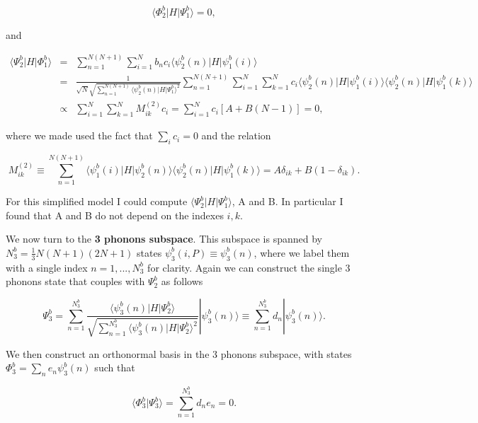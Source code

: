 \documentclass[pt12]{article}
\begin{document}
\begin{equation}
\langle \Phi^b_2 |H| \Psi^b_1 \rangle = 0,
\end{equation}

and

\begin{eqnarray}\label{Psib2_Phib1}
\langle \Psi^b_2 |H| \Phi^b_1 \rangle &=& \sum_{n=1}^{N(N+1)}
\sum_{i=1}^{N} b_n c_i \langle \psi^b_2(n) | H | \psi^b_1(i) \rangle
\\ \nonumber &=& \frac{1}{\sqrt{N}\sqrt{\sum_{n=1}^{N(N+1)} \langle
\psi^b_2(n) | H | \Psi^b_1 \rangle^2}} \sum_{n=1}^{N(N+1)}
\sum_{i=1}^{N} \sum_{k=1}^{N} c_i \langle \psi^b_2(n) | H |
\psi^b_1(i) \rangle \langle \psi^b_2(n) | H | \psi^b_1(k) \rangle
\\ \nonumber &\propto& \sum_{i=1}^{N}
\sum_{k=1}^{N} M^{(2)}_{ik} c_i = \sum_{i=1}^{N} c_i \left[ A +
B(N-1) \right] = 0,
\end{eqnarray}

where we made used the fact that $\sum_i c_i = 0$ and the relation

\begin{equation}\label{AB_relation}
M^{(2)}_{ik}\equiv \sum_{n=1}^{N(N+1)} \langle \psi^b_1(i)  | H |
\psi^b_2(n) \rangle \langle \psi^b_2(n) | H | \psi^b_1(k) \rangle =
A \delta_{ik} + B (1-\delta_{ik}).
\end{equation}

For this simplified model I could compute $\langle \Psi^b_2 |H|
\Psi^b_1 \rangle$, A and B. In particular I found that A and B do
not depend on the indexes $i,k$.

We now turn to the \textbf{3 phonons subspace}. This subspace is
spanned by $N^b_3=\frac{1}{3}N(N+1)(2N+1)$ states $\psi^b_3(i,
P)\equiv \psi^b_3(n)$, where we label them with a single index
$n=1,...,N^b_3$ for clarity. Again we can construct the single 3
phonons state that couples with $\Psi^b_2$ as follows

\begin{equation}
\Psi^b_3=\sum_{n=1}^{N^b_3} \frac{ \langle \psi^b_3(n) | H |
\Psi^b_2 \rangle}{\sqrt{\sum_{n=1}^{N^b_3} \langle \psi^b_3(n) | H |
\Psi^b_2 \rangle^2}} |\psi^b_3(n)\rangle \equiv \sum_{n=1}^{N^b_3}
d_n |\psi^b_3(n)\rangle .
\end{equation}

We then construct an orthonormal basis in the 3 phonons subspace,
with states $\Phi^b_3=\sum_n e_n \psi^b_3(n)$ such that

\begin{equation}
\langle \Phi^b_3 | \Psi^b_3 \rangle = \sum_{n=1}^{N^b_3} d_n e_n  =
0.
\end{equation}
\end{document}

